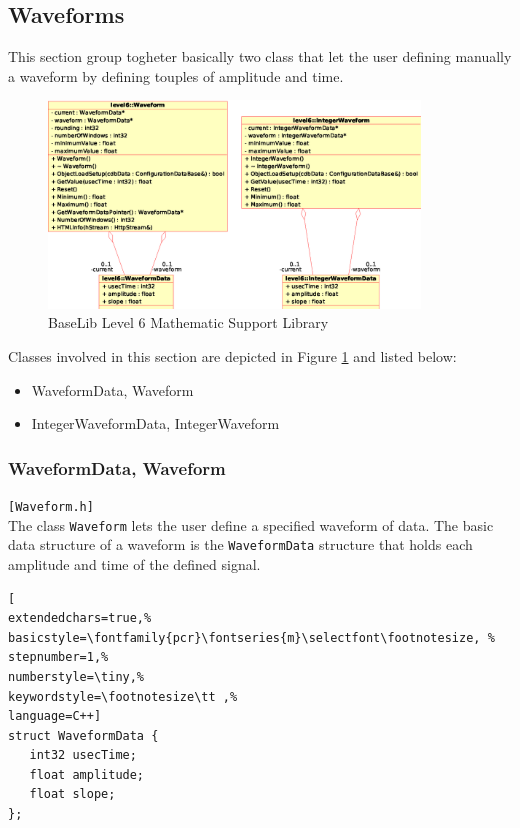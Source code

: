 \subsection{Waveforms}
This section group togheter basically two class that let the user defining manually a waveform by defining touples of amplitude and time.

\begin{figure}[h!]
 \begin{center}
  \includegraphics[width=0.88\textwidth]{level6/level6-math-waveform.eps}
  \caption{BaseLib Level 6 Mathematic Support Library}
  \label{f:level6:math-waveform}
 \end{center}
\end{figure}


Classes involved in this section are depicted in Figure \ref{f:level6:math-waveform} and listed below:

\begin{itemize}
 \item WaveformData, Waveform
 \item IntegerWaveformData, IntegerWaveform
\end{itemize}


\subsubsection{WaveformData, Waveform}
\texttt{[Waveform.h]}\\
The class \texttt{Waveform} lets the user define a specified waveform of data. The basic data structure of a waveform is the \texttt{WaveformData} structure that holds each amplitude and time of the defined signal.

\begin{lstlisting}[
extendedchars=true,%
basicstyle=\fontfamily{pcr}\fontseries{m}\selectfont\footnotesize, %
stepnumber=1,%
numberstyle=\tiny,%
keywordstyle=\footnotesize\tt ,%
language=C++]
struct WaveformData {
   int32 usecTime;
   float amplitude;
   float slope;
};
\end{lstlisting}

